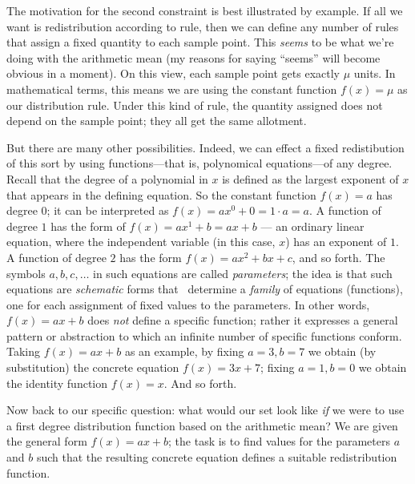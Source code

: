 The motivation for the second constraint is best illustrated by
example.  If all we want is redistribution according to rule, then we
can define any number of rules that assign a fixed quantity to each
sample point.  This \emph{seems} to be what we're doing with the
arithmetic mean (my reasons for saying ``seems'' will become obvious
in a moment).  On this view, each sample point gets exactly \(\mu\)
units.
In mathematical terms, this means we are using the constant function
\(f(x) = \mu\) as our distribution rule.  Under this kind of rule, the
quantity assigned does not depend on the sample point; they all get
the same allotment.

But there are many other possibilities.  Indeed, we can effect a fixed
redistibution of this sort by using functions---that is, polynomical
equations---of any degree.  Recall that the degree of a polynomial in
\(x\) is defined as the largest exponent of \(x\) that appears in the
defining equation.  So the constant function \(f(x) = a\) has degree
\(0\); it can be interpreted as \(f(x) = ax^0 + 0 = 1\cdot a = a\).  A
function of degree \(1\) has the form of \(f(x) = ax^1 + b = ax + b\)
--- an ordinary linear equation, where the independent variable (in
this case, \(x\)) has an exponent of \(1\).  A function of degree
\(2\) has the form \(f(x) = ax^2 + bx + c\), and so forth.  The
symbols \(a, b, c,\ldots\) in such equations are called
\emph{parameters}; the idea is that such equations are
\emph{schematic} forms that \ determine a \emph{family} of equations
(functions), one for each assignment of fixed values to the
parameters.  In other words, \(f(x)=ax+b\) does \emph{not} define
a specific function; rather it expresses a general pattern or
abstraction to which an infinite number of specific functions conform.
Taking \(f(x)=ax+b\) as an example, by fixing \(a=3, b=7\) we
obtain (by substitution) the concrete equation \(f(x)=3x+7\);
fixing \(a=1, b=0\) we obtain the identity function \(f(x)=x\).  And
so forth.

Now back to our specific question: what would our set look like
\emph{if} we were to use a first degree distribution function based on
the arithmetic mean?  We are given the general form \(f(x)=ax+b\); the
task is to find values for the parameters \(a\) and \(b\) such that
the resulting concrete equation defines a suitable redistribution
function.

